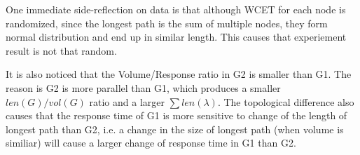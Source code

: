 \documentclass[./report.tex]{subfiles}
\begin{document}
One immediate side-reflection on data is that although WCET for each node is randomized, since the longest path is the sum of multiple nodes, they form normal distribution and end up in similar length. This causes that experiement result is not that random.

It is also noticed that the Volume/Response ratio in G2 is smaller than G1. The reason is G2 is more parallel than G1, which produces a smaller $len(G)/vol(G)$ ratio and a larger $\sum len(\lambda)$. The topological difference also causes that the response time of G1 is more sensitive to change of the length of longest path than G2, i.e. a change in the size of longest path (when volume is similiar) will cause a larger change of response time in G1 than G2.
\end{document}
